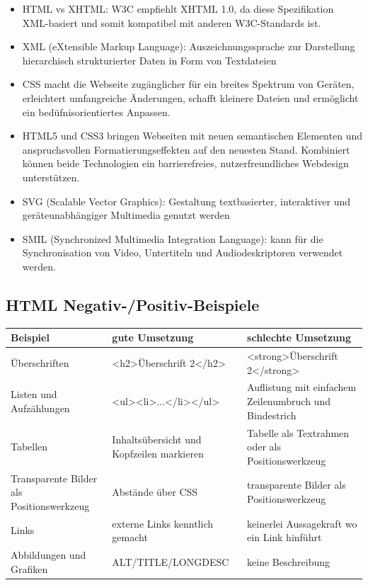 \documentclass[paper=a4, fontsize=11pt]{scrartcl} %
\numberwithin{equation}{section} %
\numberwithin{figure}{section} %
\numberwithin{table}{section} %
\begin{document}
\begin{itemize}
\item HTML vs XHTML: W3C empfiehlt XHTML 1.0, da diese Spezifikation XML-basiert und somit kompatibel mit anderen W3C-Standards ist.
\item XML (eXtensible Markup Language): Auszeichnungssprache zur Darstellung hierarchisch strukturierter Daten in Form von Textdateien
\item CSS macht die Webseite zugänglicher für ein breites Spektrum von Geräten, erleichtert umfangreiche Änderungen, schafft kleinere Dateien und ermöglicht ein bedüfnisorientiertes Anpassen.
\item HTML5 und CSS3 bringen Webseiten mit neuen semantischen Elementen und anspruchsvollen Formatierungseffekten auf den neuesten Stand. Kombiniert können beide Technologien ein barrierefreies, nutzerfreundliches Webdesign unterstützen.
\item SVG (Scalable Vector Graphics): Gestaltung textbasierter, interaktiver und geräteunabhängiger Multimedia genutzt werden
\item SMIL (Synchronized Multimedia Integration Language): kann für die Synchronisation von Video, Untertiteln und Audiodeskriptoren verwendet werden.
\end{itemize}

\subsection{HTML Negativ-/Positiv-Beispiele}

\begin{center}
    \begin{tabular}{| p{4.5cm} | p{5cm} | p{5cm} |}
    \hline
    Beispiel & gute Umsetzung & schlechte Umsetzung \\ \hline
    Überschriften & <h2>Überschrift 2</h2> & <strong>Überschrift 2</strong> \\ \hline
    Listen und Aufzählungen & <ul><li>...</li></ul> & Auflistung mit einfachem Zeilenumbruch und Bindestrich \\ \hline
    Tabellen & Inhaltsübersicht und Kopfzeilen markieren & Tabelle als Textrahmen oder als Positionswerkzeug \\ \hline
    Transparente Bilder als Positionswerkzeug & Abstände über CSS & transparente Bilder als Positionswerkzeug \\ \hline
    Links & externe Links kenntlich gemacht & keinerlei Aussagekraft wo ein Link hinführt \\ \hline
    Abbildungen und Grafiken & ALT/TITLE/LONGDESC & keine Beschreibung \\ \hline
    \end{tabular}
\end{center}
\end{document}
